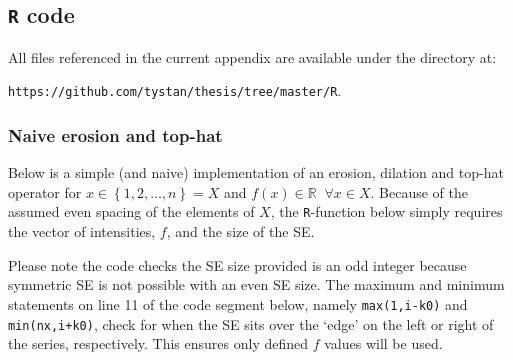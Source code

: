 \documentclass[12pt,a4paper,oneside]{report}
\begin{document}
\begin{appendix}




\chapter{\texttt{R} code} \label{app:R}


All files referenced in the current appendix are available under the directory at:
\begin{center}
\texttt{\textcolor{linkblue}{https://github.com/tystan/thesis/tree/master/R}}.
\end{center}



\clearpage





\subsection{Naive erosion and top-hat} 

Below is a simple (and naive) implementation of an erosion, dilation and top-hat operator for $x \in \left\{ 1,2,\ldots,n \right\} = X$ and $ f \left( x \right) \in \mathds{R} \; \; \forall x \in X$. Because of the assumed even spacing of the elements of $X$, the {\tt R}-function below simply requires the vector of intensities, $f$, and the size of the SE. 

Please note the code checks the SE size provided is an odd integer because symmetric SE is not possible with an even SE size. The maximum and minimum statements on line 11 of the code segment below, namely {\tt max(1,i-k0)} and {\tt min(nx,i+k0)}, check for when the SE sits over the `edge' on the left or right of the series, respectively. This ensures only defined $f$ values will be used. \\


\end{appendix}
\end{document}
